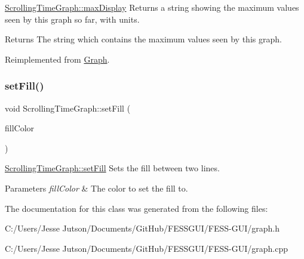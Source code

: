 \hyperlink{class_scrolling_time_graph_a3d0314f268e3eeb7396733147f710ef0}{Scrolling\+Time\+Graph\+::max\+Display} Returns a string showing the maximum values seen by this graph so far, with units. 

\begin{DoxyReturn}{Returns}
The string which contains the maximum values seen by this graph. 
\end{DoxyReturn}


Reimplemented from \hyperlink{class_graph}{Graph}.

\hypertarget{class_scrolling_time_graph_a651e6922d732be7084c207cc94257bd7}{}\label{class_scrolling_time_graph_a651e6922d732be7084c207cc94257bd7} 
\subsubsection{\texorpdfstring{set\+Fill()}{setFill()}}
{\footnotesize\ttfamily void Scrolling\+Time\+Graph\+::set\+Fill (\begin{DoxyParamCaption}\item[{Q\+Color}]{fill\+Color }\end{DoxyParamCaption})}



\hyperlink{class_scrolling_time_graph_a651e6922d732be7084c207cc94257bd7}{Scrolling\+Time\+Graph\+::set\+Fill} Sets the fill between two lines. 


\begin{DoxyParams}{Parameters}
{\em fill\+Color} & The color to set the fill to. \\
\hline
\end{DoxyParams}


The documentation for this class was generated from the following files\+:\begin{DoxyCompactItemize}
\item 
C\+:/\+Users/\+Jesse Jutson/\+Documents/\+Git\+Hub/\+F\+E\+S\+S\+G\+U\+I/\+F\+E\+S\+S-\/\+G\+U\+I/graph.\+h\item 
C\+:/\+Users/\+Jesse Jutson/\+Documents/\+Git\+Hub/\+F\+E\+S\+S\+G\+U\+I/\+F\+E\+S\+S-\/\+G\+U\+I/graph.\+cpp\end{DoxyCompactItemize}
